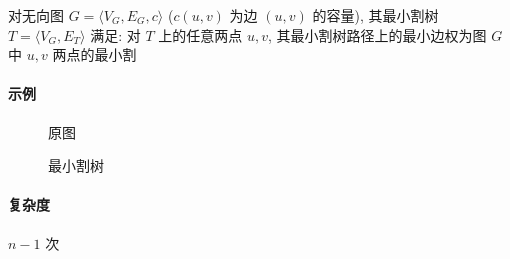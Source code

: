 对无向图 \(G=\langle V_G,E_G,c\rangle\) (\(c(u,v)\) 为边 \((u,v)\) 的容量), 其最小割树 \(T=\langle V_G,E_T\rangle\) 满足: 对 \(T\) 上的任意两点 \(u,v\), 其最小割树路径上的最小边权为图 \(G\) 中 \(u,v\) 两点的最小割

\paragraph{示例} \cite{enwiki:1187705852}

\begin{figure}
    \label{img:gomory-hu-input}
    \centering
    
    \caption{原图}
\end{figure}

\begin{figure}
    \label{img:gomory-hu-output}
    \centering
    
    \caption{最小割树}
\end{figure}

\paragraph{复杂度} \(n-1\) 次 
